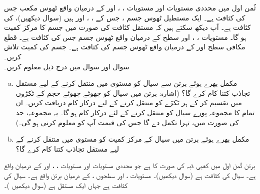 ثُمن اول میں محددی مستویات اور مستویات ،  ،  اور   کے درمیان واقع ٹھوس مکعب  جس کی کثافت  ہے۔
ایک مستطیل ٹھوس جسم ، جس کے ، ،  اور  ہیں (سوال  دیکھیں)،   کی کثافت  ہے۔ آپ دیکھ سکتے ہیں کہ مستقل کثافت کی صورت میں جسم کا مرکز  کمیت  ہو گا۔
مستویات ، ،  اور سطح  کے درمیان واقع ٹھوس جسم جس کی کثافت  ہے۔
قطع مکافی سطح   اور  کے درمیان واقع ٹھوس جسم کی کثافت  ہے۔  جسم کی کمیت تلاش کریں۔
\\
سوال  اور  سوال  میں درج ذیل معلوم کریں۔
\begin{enumerate}[a.]
\item
    مکمل بھرے ہوئے برتن سے   سیال  کو مستوی  میں منتقل کرنے کے لیے مستقل  تجاذب    کتنا  کام کرے گا؟   (اشارہ: برتن میں سیال  کو چھوٹے چھوٹے حجم کے ٹکڑوں   میں تقسیم کر کے   ہر ٹکڑے کو منتقل کرنے کے لیے درکار کام دریافت کریں۔ ان تمام کا مجموعہ پورے سیال کو منتقل کرنے کے لئے درکار کام ہو گا۔ یہ مجموعہ، حد کی صورت میں، تہرا تکمل دے گا جس کی قیمت آپ کو معلوم کرنی ہو گی۔)
\item
مکمل بھرے ہوئے برتن میں  سیال کے مرکز کمیت کو مستوی  میں منتقل کرنے کے لیے مستقل تجاذب  کتنا کام کرے گا؟
\end{enumerate}

برتن ثُمن اول میں کعبی ڈبہ کی صورت کا ہے جو محددی مستویات اور مستویات ، ،  اور  کے درمیان واقع ہے۔ سیال کی کثافت  ہے (سوال  دیکھیں)۔
مستویات ،  اور سطحوں ،  کے درمیان برتن  واقع ہے۔ سیال کی کثافت  ہے جہاں  ایک مستقل ہے (سوال  دیکھیں )۔

